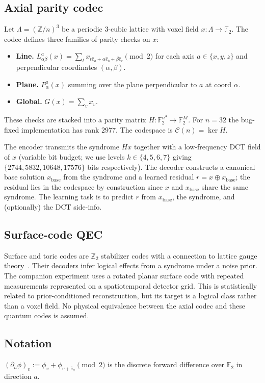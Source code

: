 \documentclass[11pt,a4paper]{article}
\begin{document}
\subsection{Axial parity codec}
Let $\Lambda = (\mathbb{Z}/n)^3$ be a periodic 3-cubic lattice with
voxel field $x : \Lambda \to \mathbb{F}_2$. The codec defines three
families of parity checks on $x$:
\begin{itemize}[nosep]
\item \textbf{Line.} $L^a_{\alpha\beta}(x) = \sum_t x_{t \hat{e}_a +
\alpha \hat{e}_b + \beta \hat{e}_c} \pmod 2$ for each axis $a \in
\{x,y,z\}$ and perpendicular coordinates $(\alpha, \beta)$.
\item \textbf{Plane.} $P^a_\alpha(x)$ summing over the plane perpendicular to $a$ at coord $\alpha$.
\item \textbf{Global.} $G(x) = \sum_v x_v$.
\end{itemize}
These checks are stacked into a parity matrix $H : \mathbb{F}_2^{n^3}
\to \mathbb{F}_2^M$. For $n=32$ the bug-fixed implementation has rank
$2977$. The codespace is $\mathcal{C}(n) = \ker H$.

The encoder transmits the syndrome $H x$ together with a low-frequency
DCT field of $x$ (variable bit budget; we use levels $k \in \{4,5,6,7\}$
giving $\{2744, 5832, 10648, 17576\}$ bits respectively). The decoder
constructs a canonical base solution $x_{\text{base}}$ from the
syndrome and a learned residual $r = x \oplus x_{\text{base}}$; the
residual lies in the codespace by construction since $x$ and
$x_{\text{base}}$ share the same syndrome. The learning task is to
predict $r$ from $x_{\text{base}}$, the syndrome, and (optionally) the
DCT side-info.

\subsection{Surface-code QEC}
Surface and toric codes are $\mathbb{Z}_2$ stabilizer codes with a
connection to lattice gauge theory~\cite{wegner1971,kitaev2003}. Their
decoders infer logical effects from a syndrome under a noise prior.
The companion experiment uses a rotated planar surface code with repeated
measurements represented on a spatiotemporal detector grid. This is
statistically related to prior-conditioned reconstruction, but its target
is a logical class rather than a voxel field. No physical equivalence
between the axial codec and these quantum codes is assumed.

\subsection{Notation}
$(\partial_a \phi)_v := \phi_v + \phi_{v + \hat e_a} \pmod 2$ is the
discrete forward difference over $\mathbb{F}_2$ in direction $a$.
\end{document}
